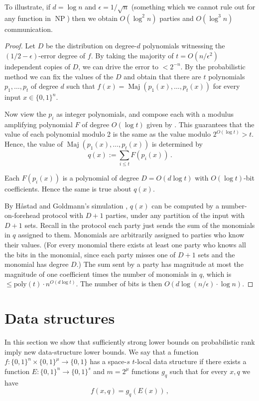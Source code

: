 \documentclass{toc}
\DeclareMathOperator{\Maj}{\mathrm{Maj}}  %
\DeclareMathOperator{\NP}{\mathrm{NP}}  %
\newcommand{\zo}{\{0, 1\}}
\newcommand{\poly}{\mathrm{poly}}
\newcommand{\e}{\epsilon}
\begin{document}
To illustrate, if $d=\log n$ and $\e=1/\sqrt{n}$ (something which
we cannot rule out for any function in $\NP$) then we obtain $O(\log^{2}n)$
parties and $O(\log^{3}n)$ communication.
\begin{proof}
Let $D$ be the distribution on degree-$d$ polynomials witnessing
the $(1/2-\e)$-error degree of $f$. By taking the majority of $t=O(n/\e^{2})$
independent copies of $D$, we can drive the error to $<2^{-n}$.
By the probabilistic method we can fix the values of the $D$ and
obtain that there are $t$ polynomials $p_{1},\ldots,p_{t}$ of degree
$d$ such that $f(x)=\Maj(p_{1}(x),\ldots,p_{t}(x))$ for every input
$x\in\zo^{n}$.

Now view the $p_{i}$ as integer polynomials, and compose each with
a modulus amplifying polynomial $F$ of degree $O(\log t)$ given
by .
This guarantees that the value of each polynomial modulo 2 is the
same as the value modulo $2^{O(\log t)}>t$. Hence, the value of
$\Maj(p_{1}(x),\ldots,p_{t}(x))$
is determined by
\[
q(x):=\sum_{i\le t}F(p_{i}(x))\,.
\]

Each $F(p_{i}(x))$ is a polynomial of degree $D=O(d\log t)$ with
$O(\log t)$-bit coefficients. Hence the same is true about $q(x)$.

By %
H{\aa}stad  %
and Goldmann's simulation \cite{HaG91}, $q(x)$ can be
computed by a number-on-forehead protocol with $D+1$ parties, under
any partition of the input with $D+1$ sets. Recall in the protocol
each party just sends the sum of the monomials in $q$ assigned to
them. Monomials are arbitrarily assigned to parties who know their
values. (For every monomial there exists at least one party who knows
all the bits in the monomial, since each party misses one of $D+1$
sets and the monomial has degree $D$.) The sum sent by a party has
magnitude at most the magnitude of one coefficient times the number
of monomials in $q$, which is $\le\poly(t)\cdot n^{O(d\log t)}$.
The number of bits is then $O(d\log(n/\e)\cdot\log n)$.
\end{proof}

\section{Data structures \label{sec:Data-structures}}

In this section we show that sufficiently strong lower bounds on probabilistic
rank imply new data-structure lower bounds. We say that a function
$f:\zo^{n}\times\zo^{\mu}\to\zo$ has a space-$s$ $t$-local data
structure if there exists a function $E:\zo^{n}\to\zo^{s}$ and $m=2^{\mu}$
functions $g_{q}$ such that for every $x,q$ we have
\[
f(x,q)=g_{q}(E(x))\,,
\]
\end{document}
